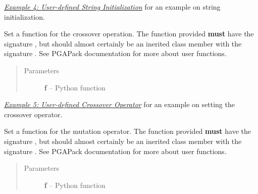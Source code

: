 \documentclass[letterpaper,11pt,english]{sphinxmanual}
\begin{document}
\begin{fulllineitems}
\begin{fulllineitems}
\begin{quote}
\begin{description}
\end{description}\end{quote}




{\hyperref[examples:sec-initstringexamples]{\emph{Example 4: User-defined String Initialization}}} for an example on string initialization.



\end{fulllineitems}


\begin{fulllineitems}
\label{api_reference:PGA.SetCrossover}
Set a function for the crossover operation.  The function  provided
\textbf{must} have the signature , but should almost
certainly be an inerited class member with the signature
.
See PGAPack documentation for more about user functions.
\begin{quote}\begin{description}
\item[{Parameters}] \leavevmode
\textbf{f} -- Python function

\end{description}\end{quote}




{\hyperref[examples:sec-crossoverexamples]{\emph{Example 5: User-defined Crossover Operator}}} for an example on setting the crossover
operator.



\end{fulllineitems}


\begin{fulllineitems}
\label{api_reference:PGA.SetMutation}
Set a function for the mutation operator.  The function  provided
\textbf{must} have the signature , but should almost
certainly be an inerited class member with the signature
.
See PGAPack documentation for more about user functions.
\begin{quote}\begin{description}
\item[{Parameters}] \leavevmode
\textbf{f} -- Python function


\end{description}
\end{quote}
\end{fulllineitems}
\end{fulllineitems}
\end{document}
